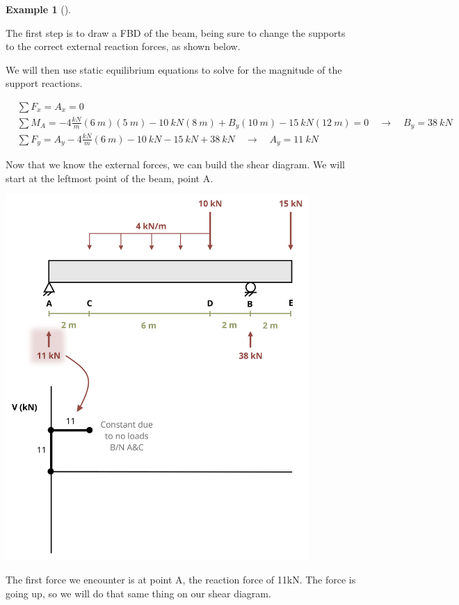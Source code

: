 \documentclass[
  letterpaper,
  DIV=11,
  numbers=noendperiod]{scrreprt}
\theoremstyle{definition}
\newtheorem{example}{Example}[chapter]
\theoremstyle{remark}
\begin{document}
\begin{tcolorbox}
\begin{example}[]
\begin{tcolorbox}
The first step is to draw a FBD of the beam, being sure to change the
supports to the correct external reaction forces, as shown below.

We will then use static equilibrium equations to solve for the magnitude
of the support reactions.

\[
\begin{aligned}
&\sum F_x=A_x=0 \\
&\sum M_A=-4\frac{kN}{m}(6{~m})(5{~m})-10{~kN}(8{~m})+B_y(10{~m})-15{~kN}(12{~m})=0 \quad\rightarrow\quad B_y =38{~kN} \\
&\sum F_y=A_y-4\frac{kN}{m}(6{~m})-10{~kN}-15{~kN}+38{~kN} \quad\rightarrow\quad A_y =11{~kN}
\end{aligned}
\]

Now that we know the external forces, we can build the shear diagram. We
will start at the leftmost point of the beam, point A.

\begin{center}
\includegraphics[width=4.54167in,height=\textheight]{images/CH7 PNGs/example 7.3 part 3.png}
\end{center}

The first force we encounter is at point A, the reaction force of 11kN.
The force is going up, so we will do that same thing on our shear
diagram.


\end{tcolorbox}
\end{example}
\end{tcolorbox}
\end{document}
